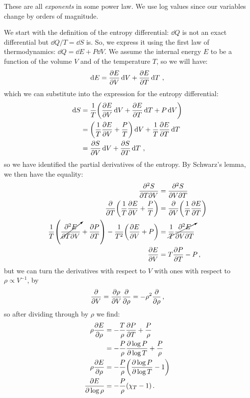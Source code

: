 \documentclass[main.tex]{subfiles}
\begin{document}
These are all \emph{exponents} in some power law.
We use log values since our variables change by orders of magnitude.

We start with  the definition of the entropy differential: \(\dd{Q}\) is not an exact differential but \(\dd{Q} / T = \dd{S}\) is. So, we express it using the first law of thermodynamics: \(\dd{Q} = \dd{E} + P \dd{V}\). 
We assume the internal energy \(E\) to be a function of the volume \(V\) and of the temperature \(T\), so we will have: 
%
\begin{align}
\dd{E} = \pdv{E}{V} \dd{V} + \pdv{E}{T} \dd{T}
\,,
\end{align}
%
which we can substitute into the expression for the entropy differential: 
%
\begin{subequations}
\begin{align}
\dd{S} &= \frac{1}{T} \qty(\pdv{E}{V} \dd{V} + \pdv{E}{T} \dd{T} + P \dd{V})  \\
&= \qty(\frac{1}{T} \pdv{E}{V} + \frac{P}{T}) \dd{V} 
+ \frac{1}{T} \pdv{E}{T} \dd{T}  \\
&= \pdv{S}{V} \dd{V} + \pdv{S}{T} \dd{T}
\,,
\end{align}
\end{subequations}
%
so we have identified the partial derivatives of the entropy. By Schwarz's lemma, we then have the equality: 
%
\begin{subequations}
\begin{align}
\pdv[2]{S}{T}{V} &= \pdv[2]{S}{V}{T}  \\
\pdv{}{T} \qty(\frac{1}{T} \pdv{E}{V} + \frac{P}{T})&=
\pdv{}{V} \qty(\frac{1}{T} \pdv{E}{T})  \\
\frac{1}{T} \qty(\cancelto{}{\pdv[2]{E}{T}{V}} + \pdv{P}{T} ) 
- \frac{1}{T^2} \qty(\pdv{E}{V} + P) &=
\cancelto{}{\frac{1}{T} \pdv[2]{E}{V}{T}}  \\
 \pdv{E}{V} &= T \pdv{P}{T} - P 
\,,
\end{align}
\end{subequations}
%
but we can turn the derivatives with respect to \(V\) with ones with respect to \(\rho \propto V^{-1}\), by 
%
\begin{align}
\pdv{}{V} = \pdv{\rho }{V} \pdv{}{\rho } = - \rho^2 \pdv{}{\rho }
\,,
\end{align}
%
so after dividing through by \(\rho \) we find: 
%
\begin{align}
\rho \pdv{E}{\rho } &= -\frac{T}{\rho } \pdv{P}{T} + \frac{P}{\rho }  \\
&= - \frac{P}{\rho } \pdv{\log P }{\log T} + \frac{P}{\rho }  \\
\rho \pdv{E}{\rho }&= - \frac{P}{\rho } \qty(\pdv{\log P }{\log T} -1 )  \\
\pdv{E}{\log \rho }&= -\frac{P}{\rho } \qty(\chi_{T} - 1)
\,.
\end{align}
%
\end{document}
